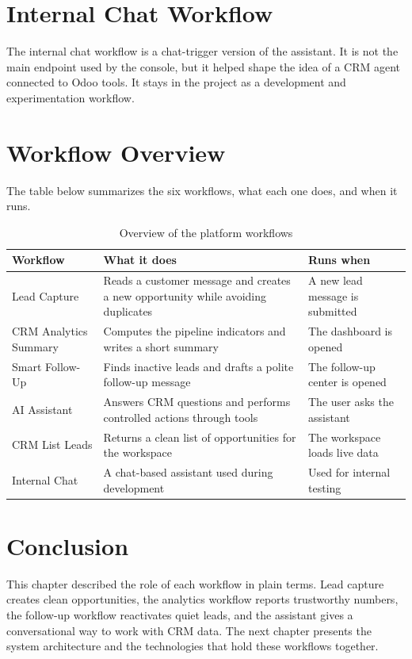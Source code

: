 \documentclass[12pt,a4paper,oneside]{report}
\begin{document}
\section{Internal Chat Workflow}\label{sumlbl:c3s7}
The internal chat workflow is a chat-trigger version of the assistant. It is not the main endpoint used by the console, but it helped shape the idea of a CRM agent connected to Odoo tools. It stays in the project as a development and experimentation workflow.

\section{Workflow Overview}\label{sumlbl:c3s8}
The table below summarizes the six workflows, what each one does, and when it runs.

\begin{table}[H]
\centering
\small
\begin{tabularx}{\textwidth}{|p{3.4cm}|X|p{4.1cm}|}
\hline\rowcolor{TabHead}
\textbf{Workflow} & \textbf{What it does} & \textbf{Runs when} \\
\hline
Lead Capture & Reads a customer message and creates a new opportunity while avoiding duplicates & A new lead message is submitted \\
\hline
CRM Analytics Summary & Computes the pipeline indicators and writes a short summary & The dashboard is opened \\
\hline
Smart Follow-Up & Finds inactive leads and drafts a polite follow-up message & The follow-up center is opened \\
\hline
AI Assistant & Answers CRM questions and performs controlled actions through tools & The user asks the assistant \\
\hline
CRM List Leads & Returns a clean list of opportunities for the workspace & The workspace loads live data \\
\hline
Internal Chat & A chat-based assistant used during development & Used for internal testing \\
\hline
\end{tabularx}
\caption{Overview of the platform workflows}
\end{table}

\section{Conclusion}\label{sumlbl:c3s9}
This chapter described the role of each workflow in plain terms. Lead capture creates clean opportunities, the analytics workflow reports trustworthy numbers, the follow-up workflow reactivates quiet leads, and the assistant gives a conversational way to work with CRM data. The next chapter presents the system architecture and the technologies that hold these workflows together.
\end{document}

